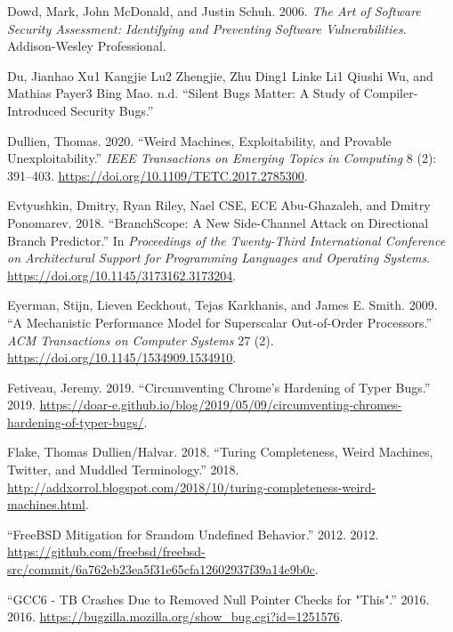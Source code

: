 \documentclass[
  a4paper,
]{report}
\newlength{\cslhangindent}
\newlength{\cslentryspacingunit} %
\newenvironment{CSLReferences}[2] %
 {%
  \setlength{\parindent}{0pt}
  \ifodd #1
  \let\oldpar\par
  \def\par{\hangindent=\cslhangindent\oldpar}
  \fi
  \setlength{\parskip}{#2\cslentryspacingunit}
 }%
 {}
\begin{document}
\begin{CSLReferences}{1}{0}
\leavevmode{}%
Dowd, Mark, John McDonald, and Justin Schuh. 2006. \emph{The Art of
Software Security Assessment: Identifying and Preventing Software
Vulnerabilities}. Addison-Wesley Professional.

\leavevmode{}%
Du, Jianhao Xu1 Kangjie Lu2 Zhengjie, Zhu Ding1 Linke Li1 Qiushi Wu, and
Mathias Payer3 Bing Mao. n.d. {``Silent Bugs Matter: A Study of
Compiler-Introduced Security Bugs.''}

\leavevmode{}%
Dullien, Thomas. 2020. {``Weird Machines, Exploitability, and Provable
Unexploitability.''} \emph{IEEE Transactions on Emerging Topics in
Computing} 8 (2): 391--403.
\url{https://doi.org/10.1109/TETC.2017.2785300}.

\leavevmode{}%
Evtyushkin, Dmitry, Ryan Riley, Nael CSE, ECE Abu-Ghazaleh, and Dmitry
Ponomarev. 2018. {``BranchScope: A New Side-Channel Attack on
Directional Branch Predictor.''} In \emph{Proceedings of the
Twenty-Third International Conference on Architectural Support for
Programming Languages and Operating Systems}.
\url{https://doi.org/10.1145/3173162.3173204}.

\leavevmode{}%
Eyerman, Stijn, Lieven Eeckhout, Tejas Karkhanis, and James E. Smith.
2009. {``A Mechanistic Performance Model for Superscalar Out-of-Order
Processors.''} \emph{{ACM} Transactions on Computer Systems} 27 (2).
\url{https://doi.org/10.1145/1534909.1534910}.

\leavevmode{}%
Fetiveau, Jeremy. 2019. {``Circumventing Chrome's Hardening of Typer
Bugs.''} 2019.
\url{https://doar-e.github.io/blog/2019/05/09/circumventing-chromes-hardening-of-typer-bugs/}.

\leavevmode{}%
Flake, Thomas Dullien/Halvar. 2018. {``Turing Completeness, Weird
Machines, Twitter, and Muddled Terminology.''} 2018.
\url{http://addxorrol.blogspot.com/2018/10/turing-completeness-weird-machines.html}.

\leavevmode{}%
{``FreeBSD Mitigation for Srandom Undefined Behavior.''} 2012. 2012.
\url{https://github.com/freebsd/freebsd-src/commit/6a762eb23ea5f31e65cfa12602937f39a14e9b0c}.

\leavevmode{}%
{``GCC6 - TB Crashes Due to Removed Null Pointer Checks for "This".''}
2016. 2016. \url{https://bugzilla.mozilla.org/show_bug.cgi?id=1251576}.


\end{CSLReferences}
\end{document}
